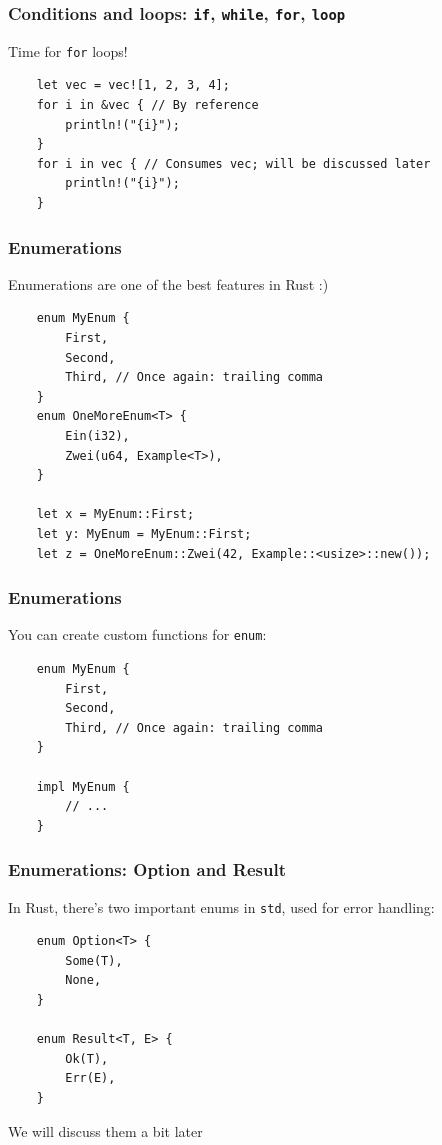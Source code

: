 \documentclass[aspectratio=1610,t]{beamer}
\begin{document}
\begin{frame}[fragile]
\frametitle{Conditions and loops: \texttt{if}, \texttt{while}, \texttt{for}, \texttt{loop}}
Time for \texttt{for} loops!

\begin{verbatim}
    let vec = vec![1, 2, 3, 4];
    for i in &vec { // By reference
        println!("{i}");
    }
    for i in vec { // Consumes vec; will be discussed later
        println!("{i}");
    }
\end{verbatim}
\end{frame}


\begin{frame}[fragile]
\frametitle{Enumerations}
Enumerations are one of the best features in Rust :)

\begin{verbatim}
    enum MyEnum {
        First,
        Second,
        Third, // Once again: trailing comma
    }
    enum OneMoreEnum<T> {
        Ein(i32),
        Zwei(u64, Example<T>),
    }

    let x = MyEnum::First;
    let y: MyEnum = MyEnum::First;
    let z = OneMoreEnum::Zwei(42, Example::<usize>::new());
\end{verbatim}
\end{frame}


\begin{frame}[fragile]
\frametitle{Enumerations}
You can create custom functions for \texttt{enum}:

\begin{verbatim}
    enum MyEnum {
        First,
        Second,
        Third, // Once again: trailing comma
    }

    impl MyEnum {
        // ...
    }
\end{verbatim}
\end{frame}


\begin{frame}[fragile]
\frametitle{Enumerations: Option and Result}
In Rust, there's two important enums in \texttt{std}, used for error handling:

\begin{verbatim}
    enum Option<T> { 
        Some(T),
        None,
    }

    enum Result<T, E> {
        Ok(T),
        Err(E),
    }
\end{verbatim}

We will discuss them a bit later
\end{frame}
\end{document}
